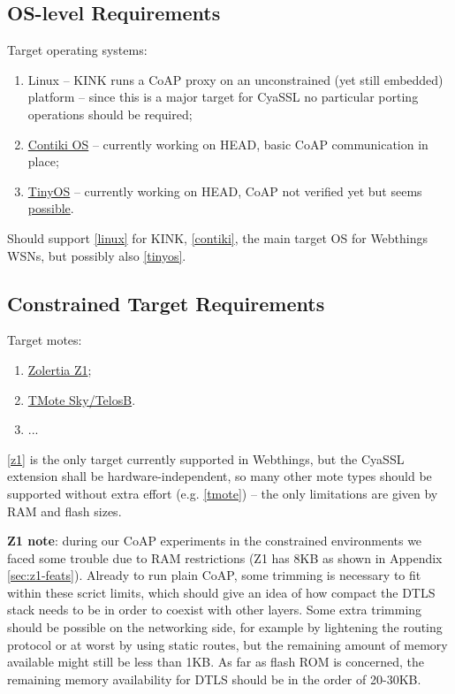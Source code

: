 \documentclass[10pt]{article}
\begin{document}
\subsection{OS-level Requirements}
\label{sec:reqs-os}
Target operating systems:
\begin{enumerate}
\item\label{linux} Linux -- KINK runs a CoAP proxy on an unconstrained (yet still embedded) platform -- since this is a major target for CyaSSL no particular porting operations should be required;
\item\label{contiki} \href{http://www.contiki-os.org}{Contiki OS} -- currently working on HEAD, basic CoAP communication in place;
\item\label{tinyos} \href{http://www.tinyos.net}{TinyOS} -- currently working on HEAD, CoAP not verified yet but seems \href{http://zolertia.sourceforge.net/wiki/index.php/Blip_v2.0}{possible}.
\end{enumerate}

Should support \ref{linux} for KINK, \ref{contiki}, the main target OS for Webthings WSNs, but possibly also \ref{tinyos}.

\subsection{Constrained Target Requirements}
Target motes:
\begin{enumerate}
\item\label{z1} \href{http://www.zolertia.com/ti}{Zolertia Z1};
\item\label{tmote} \href{http://www.ti.com/tool/msp430-3p-motei-tmotesky-dsgkt}{TMote Sky/TelosB}.
\item ...
\end{enumerate}

\ref{z1} is the only target currently supported in Webthings, but the CyaSSL extension shall be hardware-independent, so many other mote types should be supported without extra effort (e.g. \ref{tmote}) -- the only limitations are given by RAM and flash sizes.

\textbf{Z1 note}: during our CoAP experiments in the constrained environments we faced some trouble due to RAM restrictions (Z1 has 8KB as shown in Appendix \ref{sec:z1-feats}). Already to run plain CoAP, some trimming is necessary to fit within these scrict limits, which should give an idea of how compact the DTLS stack needs to be in order to coexist with other layers. Some extra trimming should be possible on the networking side, for example by lightening the routing protocol or at worst by using static routes, but the remaining amount of memory available might still be less than 1KB. As far as flash ROM is concerned, the remaining memory availability for DTLS should be in the order of 20-30KB.
\end{document}

